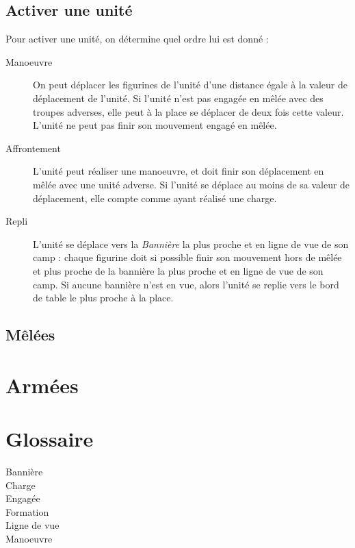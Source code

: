 \documentclass[10pt,a4paper]{book}
\begin{document}
\section{Activer une unité}
Pour activer une unité, on détermine quel ordre lui est donné :
\begin{description}
\item[Manoeuvre] On peut déplacer les figurines de l'unité d'une distance égale à la valeur de déplacement de l'unité. Si l'unité n'est pas engagée en mêlée avec des troupes adverses, elle peut à la place se déplacer de deux fois cette valeur. L'unité ne peut pas finir son mouvement engagé en mêlée.
\item[Affrontement] L'unité peut réaliser une manoeuvre, et doit finir son déplacement en mêlée avec une unité adverse. Si l'unité se déplace au moins de sa valeur de déplacement, elle compte comme ayant réalisé une charge.
\item[Repli] L'unité se déplace vers la \emph{Bannière} la plus proche et en ligne de vue de son camp : chaque figurine doit si possible finir son mouvement hors de mêlée et plus proche de la bannière la plus proche et en ligne de vue de son camp. Si aucune bannière n'est en vue, alors l'unité se replie vers le bord de table le plus proche à la place.
\end{description}
\section{Mêlées}

\chapter{Armées}

\chapter{Glossaire}
\begin{description}
\item[Bannière]
\item[Charge]
\item[Engagée]
\item[Formation]
\item[Ligne de vue]
\item[Manoeuvre]
\end{description}
\end{document}
